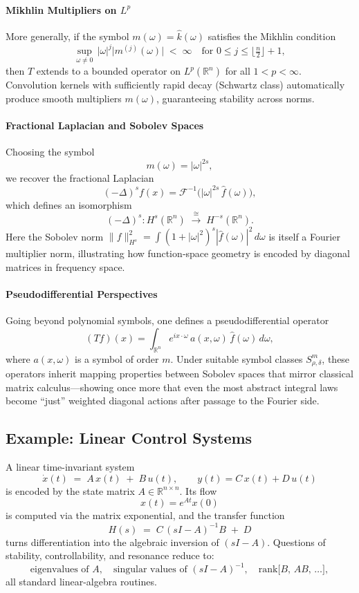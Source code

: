 \paragraph{Mikhlin Multipliers on \(L^p\)}
More generally, if the symbol \(m(\omega)=\widehat{k}(\omega)\) satisfies the Mikhlin condition
\[
\sup_{\omega\neq0}\,|\omega|^j\bigl|m^{(j)}(\omega)\bigr|\;<\;\infty
\quad\text{for }0\le j\le \bigl\lfloor\tfrac n2\bigr\rfloor+1,
\]
then \(T\) extends to a bounded operator on \(L^p(\mathbb R^n)\) for all \(1<p<\infty\).  Convolution kernels with sufficiently rapid decay (Schwartz class) automatically produce smooth multipliers \(m(\omega)\), guaranteeing stability across norms.

\paragraph{Fractional Laplacian and Sobolev Spaces}
Choosing the symbol
\[
m(\omega)=|\omega|^{2s},
\]
we recover the fractional Laplacian
\[
(-\Delta)^s f(x)
=\mathcal F^{-1}\bigl(|\omega|^{2s}\,\widehat f(\omega)\bigr),
\]
which defines an isomorphism
\[
(-\Delta)^s: H^s(\mathbb R^n)\;\xrightarrow{\;\cong\;}\;H^{-s}(\mathbb R^n).
\]
Here the Sobolev norm
\(\|f\|_{H^s}^2=\int(1+|\omega|^2)^s|\widehat f(\omega)|^2\,d\omega\)
is itself a Fourier multiplier norm, illustrating how function‐space geometry is encoded by diagonal matrices in frequency space.

\paragraph{Pseudodifferential Perspectives}
Going beyond polynomial symbols, one defines a pseudodifferential operator
\[
(Tf)(x)
=\int_{\mathbb R^n}e^{i x\cdot\omega}\,a(x,\omega)\,\widehat f(\omega)\,d\omega,
\]
where \(a(x,\omega)\) is a symbol of order \(m\).  Under suitable symbol classes \(S^m_{\rho,\delta}\), these operators inherit mapping properties between Sobolev spaces that mirror classical matrix calculus—showing once more that even the most abstract integral laws become “just” weighted diagonal actions after passage to the Fourier side.








\subsection{Example: Linear Control Systems}  
A linear time-invariant system
\[
\dot x(t) \;=\; A\,x(t) \;+\; B\,u(t),\qquad
y(t)=C\,x(t)+D\,u(t)
\]
is encoded by the state matrix \(A\in\mathbb R^{n\times n}\).  Its flow
\[
x(t)=e^{At}x(0)
\]
is computed via the matrix exponential, and the transfer function
\[
H(s)\;=\;C\,(sI - A)^{-1}B \;+\; D
\]
turns differentiation into the algebraic inversion of \((sI-A)\).  Questions of stability, controllability, and resonance reduce to:
\[
\text{eigenvalues of }A,\quad
\text{singular values of }(sI-A)^{-1},\quad
\text{rank}\bigl[\!B,\,AB,\,\dots\bigr],
\]
all standard linear-algebra routines.


